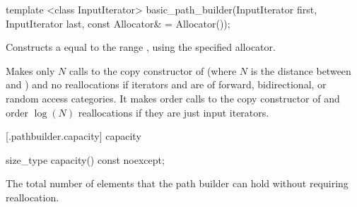 %
\begin{itemdecl}
template <class InputIterator>
basic_path_builder(InputIterator first, InputIterator last,
  const Allocator& = Allocator());
\end{itemdecl}
\begin{itemdescr}
\pnum
\effects
Constructs a  equal to the range , using the specified allocator.

\pnum
\complexity
Makes only $N$ calls to the copy constructor of  (where $N$
is the distance between
and
)
and no reallocations if iterators  and  are of forward, bidirectional, or random access categories.
It makes order
calls to the copy constructor of
and order
$\log(N)$
reallocations if they are just input iterators.

\end{itemdescr}

 [\iotwod.pathbuilder.capacity] { capacity}%

%
\begin{itemdecl}
size_type capacity() const noexcept;
\end{itemdecl}
\begin{itemdescr}
\pnum
\returns
The total number of elements that the path builder can hold without requiring reallocation.
\end{itemdescr}

